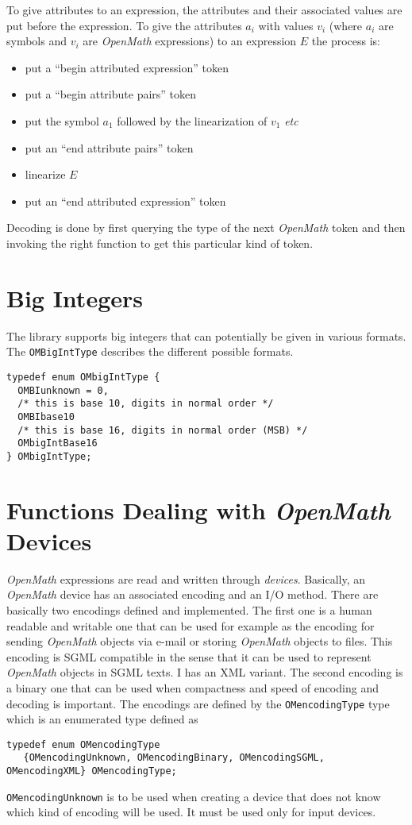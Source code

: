 \documentclass{article}
\newcommand{\OM}{{\sl OpenMath}}
\begin{document}
To give attributes to an expression, the attributes and their associated
values are put before the expression. To give the attributes $a_i$
with values $v_i$ (where $a_i$ are symbols and $v_i$ are {\OM} expressions) to
an expression $E$ the process is:
\begin{itemize} 
\item put a ``begin attributed expression'' token
\item put a ``begin attribute pairs'' token
\item put the symbol $a_1$ followed by the linearization of $v_1$ {\sl etc}
\item put an ``end attribute pairs'' token
\item linearize $E$
\item put an ``end attributed expression'' token

\end{itemize} 

Decoding is done by first querying the type of the next {\OM} token and
then invoking the right function to get this particular kind of token.

\section{Big Integers}

The library supports big integers that can potentially be given in various
formats. The {\tt OMBigIntType} describes the different possible formats.
\begin{verbatim} 
typedef enum OMbigIntType {
  OMBIunknown = 0,
  /* this is base 10, digits in normal order */
  OMBIbase10 
  /* this is base 16, digits in normal order (MSB) */
  OMbigIntBase16
} OMbigIntType;
\end{verbatim} 

\section{Functions Dealing with {\OM} Devices}

{\OM} expressions are read and written through {\sl devices}.
Basically, an {\OM} device has an associated encoding and an I/O method. 
There are basically two encodings defined and implemented. 
The first one is a human readable and writable one that can be
used for example as the encoding for sending {\OM} objects via e-mail or
storing {\OM} objects to files. 
This encoding is SGML compatible in the sense that it can be used to represent
{\OM} objects in SGML texts. I has an XML variant.
The second encoding is a binary one that can be used when compactness and
speed of encoding and decoding is important.
The encodings are defined by the {\tt OMencodingType} type which is an
enumerated type defined as  
\begin{verbatim} 
typedef enum OMencodingType 
   {OMencodingUnknown, OMencodingBinary, OMencodingSGML, OMencodingXML} OMencodingType;
\end{verbatim} 
{\tt OMencodingUnknown} is to be used when creating a device that does not
know which kind of encoding will be used. It must be used only for input
devices.
\end{document}
